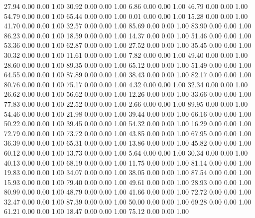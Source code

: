    27.94   0.00   0.00   1.00
   30.92   0.00   0.00   1.00
    6.86   0.00   0.00   1.00
   46.79   0.00   0.00   1.00
   54.79   0.00   0.00   1.00
   65.44   0.00   0.00   1.00
    0.01   0.00   0.00   1.00
   15.28   0.00   0.00   1.00
   41.70   0.00   0.00   1.00
   32.57   0.00   0.00   1.00
   85.69   0.00   0.00   1.00
   83.90   0.00   0.00   1.00
   86.23   0.00   0.00   1.00
   18.59   0.00   0.00   1.00
   14.37   0.00   0.00   1.00
   51.46   0.00   0.00   1.00
   53.36   0.00   0.00   1.00
   62.87   0.00   0.00   1.00
   27.52   0.00   0.00   1.00
   35.45   0.00   0.00   1.00
   30.32   0.00   0.00   1.00
   11.61   0.00   0.00   1.00
    7.82   0.00   0.00   1.00
   49.40   0.00   0.00   1.00
   28.60   0.00   0.00   1.00
   89.35   0.00   0.00   1.00
   65.12   0.00   0.00   1.00
   51.49   0.00   0.00   1.00
   64.55   0.00   0.00   1.00
   87.89   0.00   0.00   1.00
   38.43   0.00   0.00   1.00
   82.17   0.00   0.00   1.00
   80.76   0.00   0.00   1.00
   75.17   0.00   0.00   1.00
    4.32   0.00   0.00   1.00
   32.34   0.00   0.00   1.00
   26.62   0.00   0.00   1.00
   56.62   0.00   0.00   1.00
   12.26   0.00   0.00   1.00
   33.66   0.00   0.00   1.00
   77.83   0.00   0.00   1.00
   22.52   0.00   0.00   1.00
    2.66   0.00   0.00   1.00
   89.95   0.00   0.00   1.00
   54.46   0.00   0.00   1.00
   21.98   0.00   0.00   1.00
   39.44   0.00   0.00   1.00
   66.16   0.00   0.00   1.00
   50.22   0.00   0.00   1.00
   39.45   0.00   0.00   1.00
   54.32   0.00   0.00   1.00
   16.29   0.00   0.00   1.00
   72.79   0.00   0.00   1.00
   73.72   0.00   0.00   1.00
   43.85   0.00   0.00   1.00
   67.95   0.00   0.00   1.00
   36.39   0.00   0.00   1.00
   65.31   0.00   0.00   1.00
   13.86   0.00   0.00   1.00
   45.82   0.00   0.00   1.00
   60.12   0.00   0.00   1.00
   13.73   0.00   0.00   1.00
    5.64   0.00   0.00   1.00
   30.34   0.00   0.00   1.00
   40.13   0.00   0.00   1.00
   68.19   0.00   0.00   1.00
   11.75   0.00   0.00   1.00
   81.14   0.00   0.00   1.00
   19.83   0.00   0.00   1.00
   34.07   0.00   0.00   1.00
   38.05   0.00   0.00   1.00
   87.54   0.00   0.00   1.00
   15.93   0.00   0.00   1.00
   79.40   0.00   0.00   1.00
   49.61   0.00   0.00   1.00
   28.93   0.00   0.00   1.00
   80.99   0.00   0.00   1.00
   48.79   0.00   0.00   1.00
   41.66   0.00   0.00   1.00
   72.72   0.00   0.00   1.00
   32.47   0.00   0.00   1.00
   87.39   0.00   0.00   1.00
   50.00   0.00   0.00   1.00
   69.28   0.00   0.00   1.00
   61.21   0.00   0.00   1.00
   18.47   0.00   0.00   1.00
   75.12   0.00   0.00   1.00

